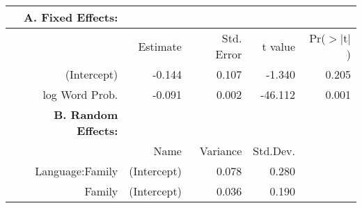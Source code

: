 \begin{tabular}{rrrrr}
 {\bf A. Fixed Effects:} \\
\hline
 & Estimate & Std. Error & t value & Pr($>$$|$t$|$) \\ 
  \hline
(Intercept) & -0.144 & 0.107 & -1.340 & 0.205 \\ 
  log Word Prob. & -0.091 & 0.002 & -46.112 & 0.001 \\ 

\hline \hline
{\bf B. Random Effects:} \\
\hline
& Name & Variance & Std.Dev. \\
\hline
Language:Family & (Intercept) & 0.078 & 0.280 \\
Family & (Intercept) & 0.036 & 0.190 \\
\end{tabular}
